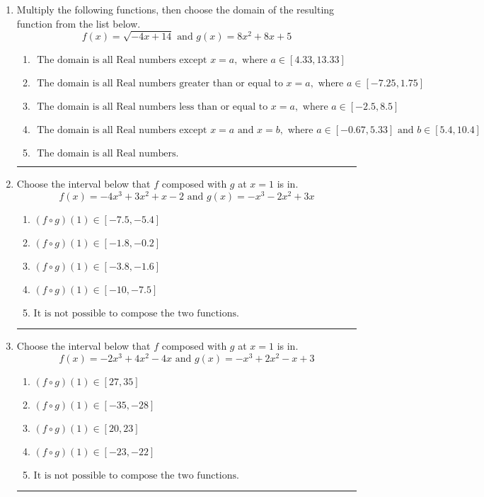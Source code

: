 \documentclass[14pt]{extbook}
\newcommand{\litem}[1]{\item#1\hspace*{-1cm}\rule{\textwidth}{0.4pt}}
\begin{document}
\begin{enumerate}
{\begin{enumerate}[label=\Alph*.]
\end{enumerate} }
\litem{
Multiply the following functions, then choose the domain of the resulting function from the list below.\[ f(x) = \sqrt{-4x+14}  \text{ and } g(x) = 8x^{2} +8 x + 5 \]\begin{enumerate}[label=\Alph*.]
\item \( \text{ The domain is all Real numbers except } x = a, \text{ where } a \in [4.33, 13.33] \)
\item \( \text{ The domain is all Real numbers greater than or equal to } x = a, \text{ where } a \in [-7.25, 1.75] \)
\item \( \text{ The domain is all Real numbers less than or equal to } x = a, \text{ where } a \in [-2.5, 8.5] \)
\item \( \text{ The domain is all Real numbers except } x = a \text{ and } x = b, \text{ where } a \in [-0.67, 5.33] \text{ and } b \in [5.4, 10.4] \)
\item \( \text{ The domain is all Real numbers. } \)

\end{enumerate} }
\litem{
Choose the interval below that $f$ composed with $g$ at $x=1$ is in.\[ f(x) = -4x^{3} +3 x^{2} +x -2 \text{ and } g(x) = -x^{3} -2 x^{2} +3 x \]\begin{enumerate}[label=\Alph*.]
\item \( (f \circ g)(1) \in [-7.5, -5.4] \)
\item \( (f \circ g)(1) \in [-1.8, -0.2] \)
\item \( (f \circ g)(1) \in [-3.8, -1.6] \)
\item \( (f \circ g)(1) \in [-10, -7.5] \)
\item \( \text{It is not possible to compose the two functions.} \)

\end{enumerate} }
\litem{
Choose the interval below that $f$ composed with $g$ at $x=1$ is in.\[ f(x) = -2x^{3} +4 x^{2} -4 x \text{ and } g(x) = -x^{3} +2 x^{2} -x + 3 \]\begin{enumerate}[label=\Alph*.]
\item \( (f \circ g)(1) \in [27, 35] \)
\item \( (f \circ g)(1) \in [-35, -28] \)
\item \( (f \circ g)(1) \in [20, 23] \)
\item \( (f \circ g)(1) \in [-23, -22] \)
\item \( \text{It is not possible to compose the two functions.} \)


\end{enumerate}}
\end{enumerate}
\end{document}

